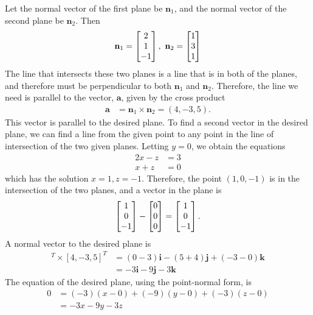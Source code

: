 \EEN
\item
Let the normal vector of the first plane be $\mathbf{n}_1$, and the normal vector of the second plane be $\mathbf{n}_2$. Then  
\begin{align*}
\mathbf{n}_1 =\BM 2 \\ 1 \\ -1 \EM, \ 
\mathbf{n}_2=\BM 1\\ 3 \\ 1 \EM
\end{align*}
The line that intersects these two planes is a line that is in both of the planes, and therefore must be perpendicular to both $\mathbf{n}_1$ and $\mathbf{n}_2$. Therefore, the line we need is parallel to the vector, $\mathbf{a}$, given by the cross product
\begin{align*}
\mathbf{a} &= \mathbf{n}_1 \times \mathbf{n}_2 = (4,-3,5).
\end{align*}
This vector is parallel to the desired plane. To find a second vector in the desired plane, we can find a line from the given point to any point in the line of intersection of the two given planes. Letting $y=0$, we obtain the equations
\begin{align*}
2x-z&=3\\
x+z&=0
\end{align*}
which has the solution $x=1, z=-1$. Therefore, the point $(1,0,-1)$ is in the intersection of the two planes, and a vector in the plane is
\begin{align*}
\begin{bmatrix} 1 \\ 0 \\ -1 \end{bmatrix}- \begin{bmatrix} 0 \\ 0 \\ 0 \end{bmatrix} = \begin{bmatrix} 1 \\ 0 \\ -1 \end{bmatrix}.
\end{align*}
A normal vector to the desired plane is 
\begin{align*}
[1,0,-1]^T \times [4,-3,5]^T 
&= (0-3)\mathbf{i} - (5+4)\mathbf{j}+(-3-0)\mathbf{k} \\
&=-3\mathbf{i} -9 \mathbf{j} -3\mathbf{k} 
\end{align*}
The equation of the desired plane, using the point-normal form, is
\begin{align*}
0&=(-3)(x-0)+(-9)(y-0)+(-3)(z-0)\\
&=-3x-9y-3z
\end{align*}

